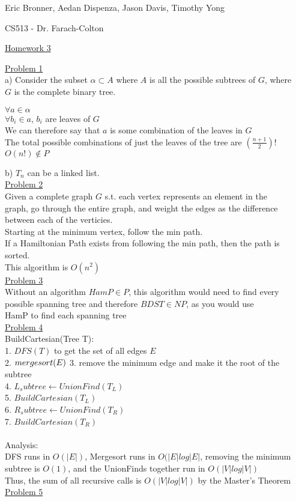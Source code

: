 \documentclass[12pt]{article}
\begin{document}
\pagestyle{headings}
\centerline{Eric Bronner, Aedan Dispenza, Jason Davis, Timothy Yong}
\centerline{CS513 - Dr. Farach-Colton}
\centerline{\underline{Homework 3}}
\noindent \underline{Problem 1}\\
a) Consider the subset $\alpha \subset A$ where $A$ is all the possible subtrees of $G$, where\\
\indent $G$ is the complete binary tree.
\begin{center}
$\forall a \in \alpha$\\
$\forall b_i \in a$, $b_i$ are leaves of $G$\\
We can therefore say that $a$ is some combination of the leaves in $G$\\
The total possible combinations of just the leaves of the tree are $(\frac{n+1}{2})!$
$O(n!) \notin P$
\end{center}
b) ${T_n}$ can be a linked list.\\
\underline{Problem 2}\\
Given a complete graph $G$ s.t. each vertex represents an element in the\\ 
\indent graph, go through the entire graph, and weight the edges as the difference\\ 
\indent between each of the verticies.\\
Starting at the minimum vertex, follow the min path.\\
If a Hamiltonian Path exists from following the min path, then the path is\\
\indent sorted.\\
This algorithm is $O(n^2)$\\
\underline{Problem 3}\\
Without an algorithm $HamP \in P$, this algorithm would need to find every\\ 
\indent possible spanning tree and therefore $BDST \in NP$, as you would use\\
\indent HamP to find each spanning tree\\
\underline{Problem 4}\\
BuildCartesian(Tree T):\\
1. $DFS(T)$ to get the set of all edges $E$\\
2. $mergesort(E)\\$
3. remove the minimum edge and make it the root of the subtree\\
4. $L_subtree \gets UnionFind(T_L)$\\
5. $BuildCartesian(T_L)$\\
6. $R_subtree \gets UnionFind(T_R)$\\
7. $BuildCartesian(T_R)$\\
\\
Analysis:\\
DFS runs in $O(|E|)$, Mergesort runs in $O(|E|log{|E|}$, removing the minimum\\ 
\indent subtree is $O(1)$, and the UnionFinds together run in $O(|V|log{|V|})$\\
Thus, the sum of all recursive calls is $O(|V|log{|V|})$ by the Master's Theorem\\
\underline{Problem 5}\\
\end{document}
